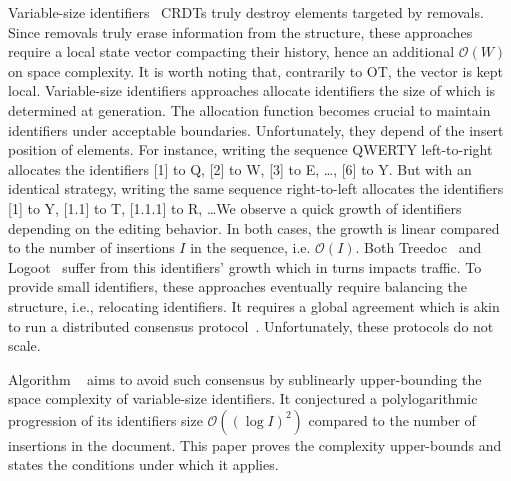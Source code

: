 \begin{asparadesc}
\item [Variable-size identifiers~\cite{nedelec2013lseq, preguica2009commutative,
    weiss2009logoot}] CRDTs truly destroy elements targeted by removals.  Since
  removals truly erase information from the structure, these approaches require
  a local state vector compacting their history, hence an additional
  $\mathcal{O}(W)$ on space complexity. It is worth noting that, contrarily to
  OT, the vector is kept local. Variable-size identifiers approaches allocate
  identifiers the size of which is determined at generation. The allocation
  function becomes crucial to maintain identifiers under acceptable
  boundaries. Unfortunately, they depend of the insert position of elements. For
  instance, writing the sequence QWERTY left-to-right allocates the identifiers
  [1] to Q, [2] to W, [3] to E, \ldots, [6] to Y. But with an identical
  strategy, writing the same sequence right-to-left allocates the identifiers
  [1] to Y, [1.1] to T, [1.1.1] to R, \ldots We observe a quick growth of
  identifiers depending on the editing behavior. In both cases, the growth is
  linear compared to the number of insertions $I$ in the sequence,
  i.e. $\mathcal{O}(I)$. Both Treedoc~\cite{preguica2009commutative} and
  Logoot~\cite{weiss2009logoot, weiss2010logootundo} suffer from this
  identifiers' growth which in turns impacts traffic.
  To provide small identifiers, these approaches eventually require balancing
  the structure, i.e., relocating identifiers. It requires a global agreement
  which is akin to run a distributed consensus
  protocol~\cite{zawirski2011asynchronous}. Unfortunately, these protocols do
  not scale.

  Algorithm \LSEQ~\cite{nedelec2013lseq} aims to avoid such consensus by
  sublinearly upper-bounding the space complexity of variable-size
  identifiers. It conjectured a polylogarithmic progression of its identifiers
  size $\mathcal{O}((\log I)^2)$ compared to the number of insertions in the
  document. This paper proves the complexity upper-bounds and states the
  conditions under which it applies.
\end{asparadesc}

